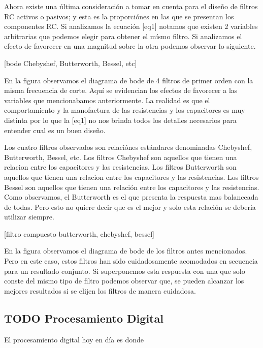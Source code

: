 \documentclass[11pt]{article}
\begin{document}
Ahora existe una última consideración a tomar en cuenta para el diseño de filtros RC activos o pasivos; y esta es la proporciónes en las que se presentan los componentes RC. Si analizamos la ecuación [eq1] notamos que existen 2 variables arbitrarias que podemos elegir para obtener el mísmo filtro. Si analizamos el efecto de favorecer en una magnitud sobre la otra podemos observar lo siguiente.

[bode Chebyshef, Butterworth, Bessel, etc]

En la figura observamos el diagrama de bode de 4 filtros de primer orden con la misma frecuencia de corte. Aquí se evidencian los efectos de favorecer a las variables que mencionabamos anteriormente. La realidad es que el comportamiento y la manofactura de las resistencias y los capacitores es muy distinta por lo que la [eq1] no nos brinda todos los detalles necesarios para entender cual es un buen diseño.

Los cuatro filtros observados son relaciónes estándares denominadas Chebyshef, Butterworth, Bessel, etc. Los filtros Chebyshef son aquellos que tienen una relacion entre los capacitores y las resistencias. Los filtros Butterworth son aquellos que tienen una relacion entre los capacitores y las resistencias. Los filtros Bessel son aquellos que tienen una relación entre los capacitores y las resistencias. Como observamos, el Butterworth es el que presenta la respuesta mas balanceada de todas. Pero esto no quiere decir que es el mejor y solo esta relación se deberia utilizar siempre.

[filtro compuesto butterworth, chebyshef, bessel]

En la figura observamos el diagrama de bode de los filtros antes mencionados. Pero en este caso, estos filtros han sido cuidadosamente acomodados en secuencia para un resultado conjunto. Si superponemos esta respuesta con una que solo conste del mismo tipo de filtro podemos observar que, se pueden alcanzar los mejores resultados si se elijen los filtros de manera cuidadosa.

\subsection{{\bfseries\sffamily TODO} Procesamiento Digital}
\label{sec:org62b28da}
El procesamiento digital hoy en día es donde
\end{document}
